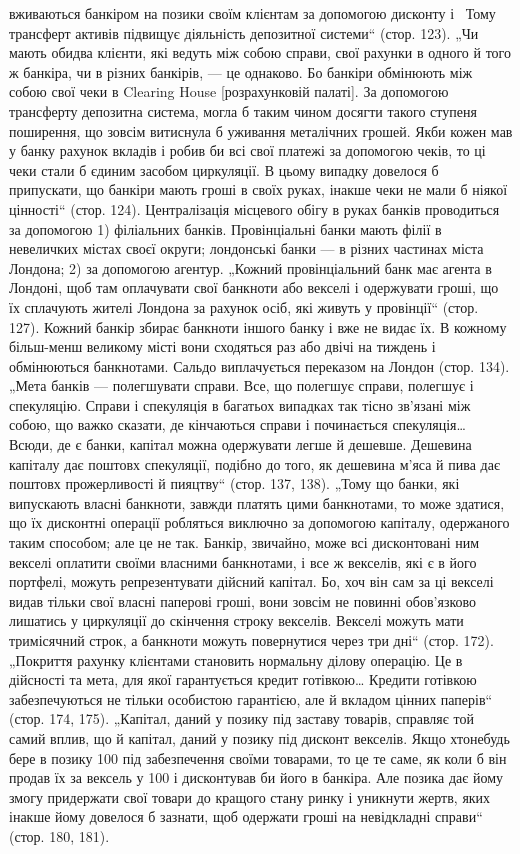 вживаються банкіром на позики своїм клієнтам за
допомогою дисконту і~ Тому трансферт активів підвищує діяльність депозитної системи“ (стор.
123). „Чи мають обидва клієнти, які ведуть між собою
справи, свої рахунки в одного й того ж банкіра, чи в різних банкірів, — це
однаково. Бо банкіри обмінюють між собою свої чеки в Clearing House [розрахунковій палаті]. За
допомогою трансферту депозитна система, могла б
таким чином досягти такого ступеня поширення, що зовсім витиснула б
уживання металічних грошей. Якби кожен мав у банку рахунок вкладів і робив би всі свої платежі за
допомогою чеків, то ці чеки стали б єдиним засобом циркуляції. В цьому випадку довелося б
припускати, що банкіри мають
гроші в своїх руках, інакше чеки не мали б ніякої цінності“ (стор. 124). Централізація місцевого
обігу в руках банків проводиться за допомогою 1) філіальних банків. Провінціальні банки мають філії
в невеличких містах своєї округи;
лондонські банки — в різних частинах міста Лондона; 2) за допомогою агентур.
„Кожний провінціальний банк має агента в Лондоні, щоб там оплачувати свої
банкноти або векселі і одержувати гроші, що їх сплачують жителі Лондона за рахунок осіб, які живуть
у провінції“ (стор. 127). Кожний банкір збирає банкноти
іншого банку і вже не видає їх. В кожному більш-менш великому місті
вони сходяться раз або двічі на тиждень і обмінюються банкнотами. Сальдо
виплачується переказом на Лондон (стор. 134). „Мета банків — полегшувати
справи. Все, що полегшує справи, полегшує і спекуляцію. Справи і спекуляція
в багатьох випадках так тісно зв’язані між собою, що важко сказати, де кінчаються справи і
починається спекуляція\dots{} Всюди, де є банки, капітал можна
одержувати легше й дешевше. Дешевина капіталу дає поштовх спекуляції,
подібно до того, як дешевина м’яса й пива дає поштовх прожерливості й пияцтву“ (стор. 137, 138).
„Тому що банки, які випускають власні банкноти, завжди
платять цими банкнотами, то може здатися, що їх дисконтні операції робляться
виключно за допомогою капіталу, одержаного таким способом; але це не так.
Банкір, звичайно, може всі дисконтовані ним векселі оплатити своїми власними
банкнотами, і все ж  векселів, які є в його портфелі, можуть репрезентувати дійсний капітал. Бо,
хоч він сам за ці векселі видав тільки свої власні паперові гроші, вони зовсім не повинні
обов’язково лишатись у циркуляції до
скінчення строку векселів. Векселі можуть мати тримісячний строк, а банкноти
можуть повернутися через три дні“ (стор. 172). „Покриття рахунку клієнтами
становить нормальну ділову операцію. Це в дійсності та мета, для якої
гарантується кредит готівкою\dots{} Кредити готівкою забезпечуються не тільки
особистою гарантією, але й вкладом цінних паперів“ (стор. 174, 175). „Капітал,
даний у позику під заставу товарів, справляє той самий вплив, що й капітал,
даний у позику під дисконт векселів. Якщо хтонебудь бере в позику 100 під забезпечення своїми товарами, то це те саме, як коли б він продав
їх за вексель у 100 і дисконтував би його в банкіра.
Але позика дає йому змогу придержати свої товари до кращого стану ринку і
уникнути жертв, яких інакше йому довелося б зазнати, щоб одержати гроші
на невідкладні справи“ (стор. 180, 181).


